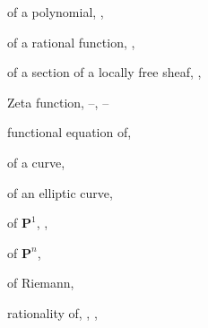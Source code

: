 {{\noindent\hspace*{7.5bp}of a polynomial, , \par
\noindent\hspace*{7.5bp}of a rational function, , \par
\noindent\hspace*{7.5bp}of a section of a locally free sheaf, ,\par
\noindent\hspace*{15.0bp}\par
\noindent\hspace*{0.0bp}Zeta function, --, --\par
\noindent\hspace*{7.5bp}functional equation of, \par
\noindent\hspace*{7.5bp}of a curve, \par
\noindent\hspace*{7.5bp}of an elliptic curve, \par
\noindent\hspace*{7.5bp}of $\mathbf P^1$, , \par
\noindent\hspace*{7.5bp}of $\mathbf P^n$, \par
\noindent\hspace*{7.5bp}of Riemann, \par
\noindent\hspace*{7.5bp}rationality of, , , \par
}
}
